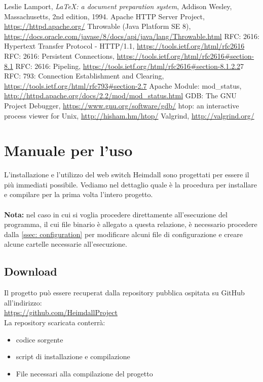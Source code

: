 \documentclass[italian]{tktltiki2}
\begin{document}
\newpage
%
%
\renewcommand{\refname}{\normalfont\selectfont\normalsize\textbf{Annotazioni}} 
\begin{thebibliography}{9}
  Leslie Lamport,
  \emph{\LaTeX: a document preparation system},
  Addison Wesley, Massachusetts,
  2nd edition,
  1994.
  Apache HTTP Server Project, \url{https://httpd.apache.org/}
  Throwable (Java Platform SE 8), \url{https://docs.oracle.com/javase/8/docs/api/java/lang/Throwable.html}
  RFC: 2616: Hypertext Transfer Protocol - HTTP/1.1, \url{https://tools.ietf.org/html/rfc2616}
  RFC: 2616: Persistent Connections, \url{https://tools.ietf.org/html/rfc2616#section-8.1}
  RFC: 2616: Pipeling, \url{https://tools.ietf.org/html/rfc2616#section-8.1.2.2}7
  RFC: 793: Connection Establishment and Clearing, \url{https://tools.ietf.org/html/rfc793#section-2.7}
  Apache Module: mod\_status, \url{http://httpd.apache.org/docs/2.2/mod/mod_status.html}
  GDB: The GNU Project Debugger, \url{https://www.gnu.org/software/gdb/}
  htop: an interactive process viewer for Unix, \url{http://hisham.hm/htop/}
  Valgrind, \url{http://valgrind.org/}
\end{thebibliography}

\newpage
\appendix
\newpage
\section{Manuale per l'uso}
L'installazione e l'utilizzo del web switch Heimdall sono progettati per essere il più immediati possibile. Vediamo nel dettaglio quale è la procedura per installare e compilare per la prima volta l'intero progetto. 
\\
\\
\textbf{Nota:} nel caso in cui si voglia procedere direttamente all'esecuzione del programma, il cui file binario è allegato a questa relazione, è necessario procedere dalla \ref{ssec: configuration} per modificare alcuni file di configurazione e creare alcune cartelle necessarie all'esecuzione.
\subsection{Download}
Il progetto può essere recuperat dalla repository pubblica ospitata su GitHub all'indirizzo:
\\
\url{https://github.com/HeimdallProject} 
\\
La repository scaricata conterrà:
\begin{itemize}
  \item codice sorgente
  \item script di installazione e compilazione
  \item File necessari alla compilazione del progetto
\end{itemize}
\end{document}

